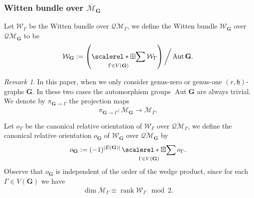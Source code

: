 \documentclass[11pt]{amsart}
\theoremstyle{definition}
\theoremstyle{remark}
\newtheorem{rmk}[dummy]{Remark}
\newcommand{\oQMb}{{\overline{\mathcal{QM}}}}
\newcommand{\<}{\left<}
\renewcommand{\>}{\right>}
\numberwithin{equation}{section}
\def\Mbar{{\overline{\mathcal M}}}
\def\h{{\mathfrak h}}
\DeclareMathOperator*{\bboxplus}{\scalerel*{\boxplus}{\sum}}
\DeclareMathOperator*{\bboxtimes}{\scalerel*{\boxtimes}{\sum}}
\begin{document}
\subsubsection{Witten bundle over $\Mbar_\mathbf{G}$}
Let $\mathcal W_\Gamma$ be the Witten bundle over $\oQMb_\Gamma$, we define the Witten bundle $\mathcal W_\mathbf{G}$ over $\oQMb_\mathbf{G}$ to be 
$$
 \mathcal W_\mathbf{G}:= \left(\bboxplus_{\Gamma\in V(\mathbf{G})}\mathcal W_\Gamma\right)\bigg\slash \operatorname{Aut} \mathbf{G}.
$$
\begin{rmk}\label{rmk aut trivial}
    In %
this %
paper, when we %
only consider genus-zero or genus-one  $(r,\h)$-graphs $\mathbf{G}$. In these two cases the automorphism groups $\operatorname{Aut}\mathbf{G}$ are always trivial. We denote by $\pi_{\mathbf{G}\to\Gamma}$ the projection %
maps 
    $$
\pi_{\mathbf{G}\to\Gamma}\colon \Mbar_{\mathbf{G}}\to \Mbar_\Gamma. 
$$
\end{rmk}
Let $o_\Gamma$ %
be the canonical relative orientation of $\mathcal W_\Gamma$ over $\oQMb_\Gamma$, we define the canonical relative orientation $o_\mathbf{G}$ of $\mathcal W_\mathbf{G}$ over $\oQMb_\mathbf{G}$ by
\begin{equation}\label{eq orientation point insertion}
    o_\mathbf{G}:=(-1)^{\lvert E(\mathbf{G})\rvert}\bboxtimes_{\Gamma\in V(\mathbf{G})}  o_\Gamma.
\end{equation}
Observe that $o_\mathbf{G}$ is independent of the order of the wedge product, since for each $\Gamma\in V(\mathbf{G})$ we have 
$$
\dim \Mbar_\Gamma \equiv \operatorname{rank} \mathcal W_\Gamma \mod 2.
$$
\end{document}
